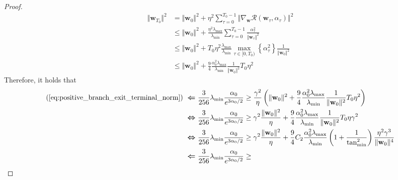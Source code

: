 \documentclass[pdflatex,sn-basic]{sn-jnl}%
\theoremstyle{thmstyleone}%
\begin{document}
\begin{appendices}
\begin{proof}
\begin{equation*}
\begin{aligned}
    \Vert \mathbf{w}_{T_0} \Vert^2 
    & = 
    \Vert \mathbf{w}_{0} \Vert^2 
    + \eta^2 
    \sum_{\tau=0}^{T_0 - 1}
    \left\Vert 
        \nabla_{\mathbf{w}} \mathcal{R} \left(\mathbf{w}_{\tau}, \alpha_{\tau}\right)
    \right\Vert^2
    \\ & \le 
    \Vert \mathbf{w}_{0} \Vert^2 
    + 
    \frac{\eta^2 \lambda_{\max}}{\lambda_{\min}}
    \sum_{\tau=0}^{T_0 - 1}
    \frac{\alpha_{\tau}^2}{\Vert \mathbf{w}_\tau \Vert^2}
    \\ & \le 
    \Vert \mathbf{w}_{0} \Vert^2 
    + 
    T_0 \eta^2 \frac{ \lambda_{\max}}{\lambda_{\min}}
    \max_{\tau \in [0, T_0)} \left\{ \alpha_{\tau}^2 \right\}
    \frac{1}{\Vert \mathbf{w}_{0} \Vert^2}
    \\ & \le 
    \Vert \mathbf{w}_{0} \Vert^2 
    + 
      \frac{9}{4} \frac{ \alpha_{0}^2 \lambda_{\max}}{\lambda_{\min}}
    \frac{1}{\Vert \mathbf{w}_{0} \Vert^2} T_0 \eta^2
  \end{aligned}
  \end{equation*}
  Therefore, it holds that 
  \begin{equation}\label{eq:positive_branch_exit_initial_sufficient}
  \begin{aligned}
    (\ref{eq:positive_branch_exit_terminal_norm}) 
    \ \boldsymbol{\Leftarrow} \ &
    \frac{3}{256}
    \lambda_{\min}
    \frac{\alpha_0 }{e^{3 \alpha_0 / 2 }}
    \ge
    \frac{\gamma^2}{\eta}
    \left(
      \Vert \mathbf{w}_{0} \Vert^2 
      + 
      \frac{9}{4} \frac{ \alpha_{0}^2 \lambda_{\max}}{\lambda_{\min}}
      \frac{1}{\Vert \mathbf{w}_{0} \Vert^2} T_0 \eta^2
    \right)
    \\ 
    \ \boldsymbol{\Leftrightarrow} \ &
    \frac{3}{256}
    \lambda_{\min}
    \frac{\alpha_0 }{e^{3 \alpha_0 / 2 }}
    \ge 
    \gamma^2
    \frac{\Vert \mathbf{w}_{0} \Vert^2 }{\eta}
    + 
    \frac{9}{4} \frac{ \alpha_{0}^2 \lambda_{\max}}{\lambda_{\min}}
    \frac{1}{\Vert \mathbf{w}_{0} \Vert^2} 
    T_0 \eta \gamma^2
    \\ 
    \ \boldsymbol{\Leftrightarrow} \ &
    \frac{3}{256}
    \lambda_{\min}
    \frac{\alpha_0 }{e^{3 \alpha_0 / 2 }}
    \ge 
    \gamma^2 \frac{\Vert \mathbf{w}_{0} \Vert^2}{\eta} 
    + 
    \frac{9}{4} C_2 \frac{ \alpha_{0}^2 \lambda_{\max}}{\lambda_{\min}}
    \left( 1 + \frac{1}{\tan_{\min}^2}\right)
    \frac{\eta^2 \gamma^3}{\Vert \mathbf{w}_{0} \Vert^4} 
    \\ 
    \ \boldsymbol{\Leftarrow} \ &
    \frac{3}{256}
    \lambda_{\min}
    \frac{\alpha_0 }{e^{3 \alpha_0 / 2 }}
    \ge 

\end{aligned}
\end{equation}
\end{proof}
\end{appendices}
\end{document}

